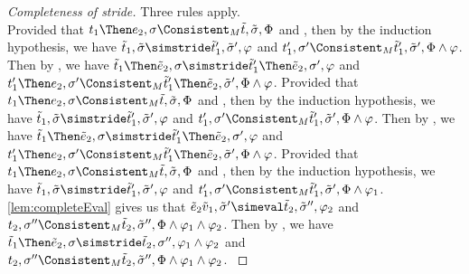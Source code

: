 \begin{proof}[Completeness of stride]
  {
  Three rules apply.\\
   {
     Provided that $t_1\Then e_2,\sigma\Consistent_M \tilde{t},\tilde{\sigma},\Phi$ and ,
     then by the induction hypothesis, we have $\tilde{t}_1,\tilde{\sigma}\simstride\tilde{t}_1',\tilde{\sigma}',\phi$
     and $t_1',\sigma'\Consistent_M\tilde{t}_1',\tilde{\sigma}',\Phi\land\phi$.
     Then by , we have $\tilde{t}_1\Then\tilde{e}_2,\sigma\simstride\tilde{t}_1'\Then\tilde{e}_2,\sigma',\phi$
     and $t_1'\Then e_2,\sigma'\Consistent_M\tilde{t}_1'\Then \tilde{e}_2,\tilde{\sigma}',\Phi\land\phi$.
  }
   {
   Provided that $t_1\Then e_2,\sigma\Consistent_M \tilde{t},\tilde{\sigma},\Phi$ and ,
   then by the induction hypothesis, we have $\tilde{t}_1,\tilde{\sigma}\simstride\tilde{t}_1',\tilde{\sigma}',\phi$
   and $t_1',\sigma'\Consistent_M\tilde{t}_1',\tilde{\sigma}',\Phi\land\phi$.
   Then by , we have $\tilde{t}_1\Then\tilde{e}_2,\sigma\simstride\tilde{t}_1'\Then\tilde{e}_2,\sigma',\phi$
   and $t_1'\Then e_2,\sigma'\Consistent_M\tilde{t}_1'\Then \tilde{e}_2,\tilde{\sigma}',\Phi\land\phi$.
   }
   {
   Provided that $t_1\Then e_2,\sigma\Consistent_M \tilde{t},\tilde{\sigma},\Phi$ and ,
   then by the induction hypothesis, we have $\tilde{t}_1,\tilde{\sigma}\simstride\tilde{t}_1',\tilde{\sigma}',\phi$
   and $t_1',\sigma'\Consistent_M\tilde{t}_1',\tilde{\sigma}',\Phi\land\phi_1$.
   \cref{lem:completeEval} gives us that $\tilde{e}_2 \tilde{v}_1,\tilde{\sigma}'\simeval \tilde{t}_2,\tilde{\sigma}'',\phi_2$
   and $t_2,\sigma''\Consistent_M\tilde{t}_2,\tilde{\sigma}'',\Phi\land\phi_1\land\phi_2$.
   Then by , we have $\tilde{t}_1\Then\tilde{e}_2,\sigma\simstride\tilde{t}_2,\sigma'',\phi_1\land\phi_2$
   and $t_2,\sigma''\Consistent_M\tilde{t}_2,\tilde{\sigma}'',\Phi\land\phi_1\land\phi_2$.
   }
  }


\end{proof}
